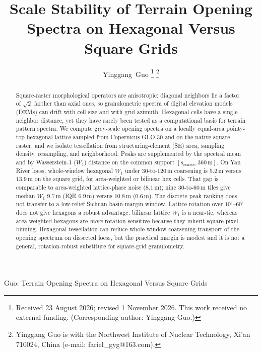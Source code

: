 \documentclass[journal]{IEEEtran}
\newif\ifhighlight
\newcommand{\rev}[1]{\ifhighlight\textcolor{blue}{#1}\else#1\fi}
\begin{document}
\title{Scale Stability of Terrain Opening Spectra on Hexagonal Versus Square Grids}

\author{Yinggang~Guo%
\thanks{Received 23 August 2026; revised 1 November 2026.
This work received no external funding.
(Corresponding author: Yinggang Guo.)}%
\thanks{Yinggang Guo is with the Northwest Institute of Nuclear Technology,
Xi'an 710024, China (e-mail: fariel\_gyg@163.com).}%
}

%
{Guo: Terrain Opening Spectra on Hexagonal Versus Square Grids}

\maketitle

\begin{abstract}
Square-raster morphological operators are anisotropic: diagonal neighbors lie
a factor of \(\sqrt{2}\) farther than axial ones, so granulometric spectra of
digital elevation models (DEMs) can drift with cell size and with grid azimuth.
Hexagonal cells have a single neighbor distance, yet they have rarely been tested
as a computational basis for terrain pattern spectra.
We compute grey-scale opening spectra on a locally \mbox{equal-area}
\mbox{pointy-top} hexagonal lattice sampled from Copernicus GLO-30 and on the
native square raster,
and we isolate tessellation from structuring-element (SE) area, sampling density,
resampling, and neighborhood.
\rev{Peaks are supplemented by the spectral mean and by Wasserstein-1 (\(W_1\))
distance on the common support \([s_{\mathrm{coarse}},360\,\mathrm{m}]\).
On Yan River loess, whole-window hexagonal \(W_1\) under 30-to-120\,m coarsening
is \(5.2\,\mathrm{m}\) versus \(13.9\,\mathrm{m}\) on the square grid, for
area-weighted or bilinear hex cells. That gap is comparable to area-weighted
lattice-phase noise (\(8.1\,\mathrm{m}\)); nine 30-to-60\,m tiles give median
\(W_1\) \(9.7\,\mathrm{m}\) (IQR \(6.9\,\mathrm{m}\)) versus \(10.8\,\mathrm{m}\)
(\(0.6\,\mathrm{m}\)). The discrete peak ranking does not transfer to a
low-relief Sichuan basin-margin window.
Lattice rotation over \(10^\circ\)--\(60^\circ\) does not give hexagons a
robust advantage: bilinear lattice \(W_1\) is a near-tie, whereas area-weighted
hexagons are \emph{more} rotation-sensitive because they inherit square-pixel
binning.}
Hexagonal tessellation can reduce whole-window coarsening transport of the
opening spectrum on dissected loess, but the practical margin is modest and it
is not a general, rotation-robust substitute for square-grid granulometry.
\end{abstract}
\end{document}
